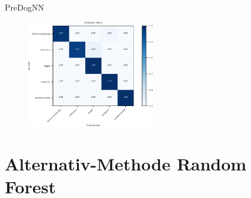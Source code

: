   \begin{frame}{PreDogNN}
    \begin{figure}
      \centering
      \includegraphics[width=0.5\textwidth]{logos/PreDogNN/confusion_matrix_PreDogNN.pdf}
      \label{fig:cm_pre}
    \end{figure}
  \end{frame}

  \section{Alternativ-Methode Random Forest}

  \begin{frame}[noframenumbering]
    \tableofcontents[currentsection]
  \end{frame}

